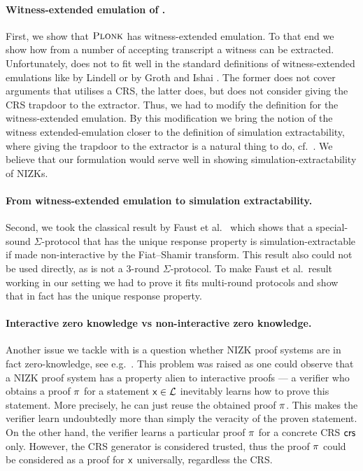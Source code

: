 \documentclass[runningheads]{llncs}
\theoremstyle{definition}
\begin{document}
\paragraph{Witness-extended emulation of \plonk{}.} 
First, we show that $\textsc{Plonk}$ has witness-extended emulation. To that end we show how from a number of accepting transcript a witness can be extracted. Unfortunately, \plonk{} does not to fit well in the standard definitions of witness-extended emulations like by Lindell \cite{JC:Lindell03} or by Groth and Ishai \cite{EC:GroIsh08}. The former does not cover arguments that utilises a CRS, the latter does, but does not consider giving the CRS trapdoor to the extractor. Thus, we had to modify the definition for the witness-extended emulation. 
By this modification we bring the notion of the witness extended-emulation closer to the definition of simulation extractability, where giving the trapdoor to the extractor is a natural thing to do, cf.~\cite{AC:Groth06,AC:DHLW10,PKC:ADKNO13,DCC:DerSla19}.
We believe that our formulation would serve well in showing simulation-extractability of NIZKs. 

\paragraph{From witness-extended emulation to simulation extractability.}
Second, we took the classical result by Faust et al.~\cite{INDOCRYPT:FKMV12} which shows that a special-sound $\Sigma$-protocol that has the unique response property is simulation-extractable if made non-interactive by the Fiat--Shamir transform. This result also could not be used directly, as \plonk{} is not a $3$-round $\Sigma$-protocol. 
To make Faust et al.~result working in our setting we had to prove it fits multi-round protocols and show that \plonk{} in fact has the unique response property.

\paragraph{Interactive zero knowledge vs non-interactive zero knowledge.}
Another issue we tackle with is a question whether NIZK proof systems are in fact zero-knowledge, see e.g.~\cite{C:Pass03}. This problem was raised as one could observe that a NIZK proof system has a property alien to interactive proofs --- a verifier who obtains a proof $\pi$ for a statement $\mathsf{x} \in \mathcal{L}$ inevitably learns how to prove this statement. More precisely, he can just reuse the obtained proof $\pi$. This makes the verifier learn undoubtedly more than simply the veracity of the proven statement. On the other hand, the verifier learns a particular proof $\pi$ for a concrete CRS $\mathsf{crs}$ only. However, the CRS generator is considered trusted, thus the proof $\pi$ could be considered as a proof for $\mathsf{x}$ universally, regardless the CRS. 
\end{document}
